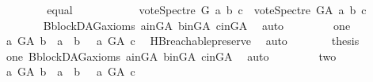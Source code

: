 \begin{isabellebody}
\ \ \isamarkupfalse%
\isanewline
\ \ \ \ \isamarkupfalse%
\ equal\ \ \ \ \isanewline
\ \ \ \ \isamarkupfalse%
\ \isamarkupfalse%
\ {\isachardoublequoteopen}vote{\isacharunderscore}{\kern0pt}Spectre\ G\ a\ b\ c\ {\isasymle}\ vote{\isacharunderscore}{\kern0pt}Spectre\ G{\isacharunderscore}{\kern0pt}A\ a\ b\ c{\isachardoublequoteclose}\isanewline
\ \ \ \ \ \ \isamarkupfalse%
\ B{}{\isachardot}{\kern0pt}blockDAG{\isacharunderscore}{\kern0pt}axioms\ a{\isacharunderscore}{\kern0pt}in{\isacharunderscore}{\kern0pt}G{\isacharunderscore}{\kern0pt}A\ b{\isacharunderscore}{\kern0pt}in{\isacharunderscore}{\kern0pt}G{\isacharunderscore}{\kern0pt}A\ c{\isacharunderscore}{\kern0pt}in{\isacharunderscore}{\kern0pt}G{\isacharunderscore}{\kern0pt}A\ \isamarkupfalse%
\ auto\isanewline
\ \ \isamarkupfalse%
\isanewline
\ \ \ \ \isamarkupfalse%
\ one\isanewline
\ \ \ \ \isamarkupfalse%
\ \isamarkupfalse%
\ {\isachardoublequoteopen}{\isacharparenleft}{\kern0pt}a\ {\isasymrightarrow}\isactrlsup {\isacharplus}{\kern0pt}\isactrlbsub G{\isacharunderscore}{\kern0pt}A\isactrlesub \ b\ {\isasymor}\ a\ {\isacharequal}{\kern0pt}\ b{\isacharparenright}{\kern0pt}\ {\isasymand}\ {\isacharparenleft}{\kern0pt}{\isasymnot}\ a\ {\isasymrightarrow}\isactrlsup {\isacharplus}{\kern0pt}\isactrlbsub G{\isacharunderscore}{\kern0pt}A\isactrlesub \ c{\isacharparenright}{\kern0pt}{\isachardoublequoteclose}\ \isamarkupfalse%
\ HB{}{\isachardot}{\kern0pt}reachable{}{\isacharunderscore}{\kern0pt}preserve\ \isamarkupfalse%
\ auto\isanewline
\ \ \ \ \isamarkupfalse%
\ \isamarkupfalse%
\ {\isacharquery}{\kern0pt}thesis\ \isamarkupfalse%
\ one\ B{}{\isachardot}{\kern0pt}blockDAG{\isacharunderscore}{\kern0pt}axioms\ a{\isacharunderscore}{\kern0pt}in{\isacharunderscore}{\kern0pt}G{\isacharunderscore}{\kern0pt}A\ b{\isacharunderscore}{\kern0pt}in{\isacharunderscore}{\kern0pt}G{\isacharunderscore}{\kern0pt}A\ c{\isacharunderscore}{\kern0pt}in{\isacharunderscore}{\kern0pt}G{\isacharunderscore}{\kern0pt}A\ \isamarkupfalse%
\ auto\isanewline
\ \ \isamarkupfalse%
\isanewline
\ \ \ \ \isamarkupfalse%
\ two\isanewline
\ \ \ \ \isamarkupfalse%
\ \isamarkupfalse%
\ {\isachardoublequoteopen}{\isasymnot}{\isacharparenleft}{\kern0pt}{\isacharparenleft}{\kern0pt}a\ {\isasymrightarrow}\isactrlsup {\isacharplus}{\kern0pt}\isactrlbsub G{\isacharunderscore}{\kern0pt}A\isactrlesub \ b\ {\isasymor}\ a\ {\isacharequal}{\kern0pt}\ b{\isacharparenright}{\kern0pt}\ {\isasymand}\ {\isacharparenleft}{\kern0pt}{\isasymnot}\ a\ {\isasymrightarrow}\isactrlsup {\isacharplus}{\kern0pt}\isactrlbsub G{\isacharunderscore}{\kern0pt}A\isactrlesub \ c{\isacharparenright}{\kern0pt}{\isacharparenright}{\kern0pt}{\isachardoublequoteclose}\ \isamarkupfalse%

\end{isabellebody}
